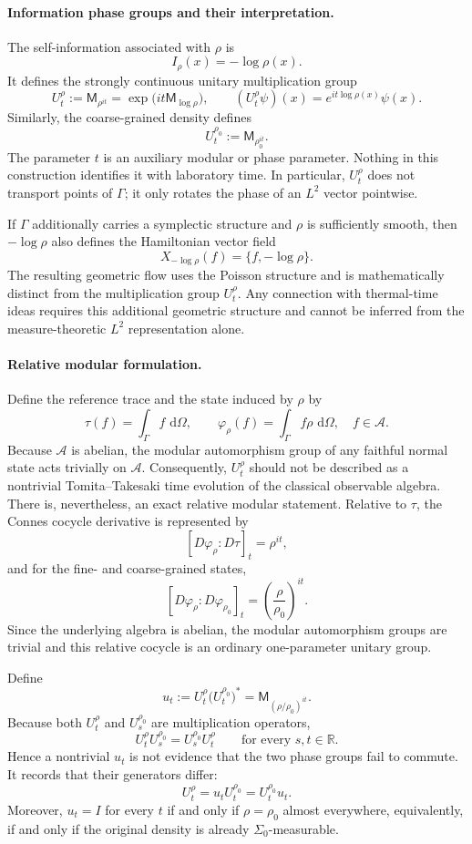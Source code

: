 \documentclass[a4paper,11pt]{article}
\theoremstyle{definition}
\newcommand{\dd}{\,\mathrm{d}}
\newcommand{\Mop}{\mathsf{M}}
\newcommand{\mA}{\mathcal{A}}
\begin{document}
\paragraph{Information phase groups and their interpretation.}
The self-information associated with $\rho$ is
\[
  I_\rho(x)=-\log\rho(x).
\]
It defines the strongly continuous unitary multiplication group
\[
  U_t^\rho:=\Mop_{\rho^{it}}
  =\exp\!\bigl(it\Mop_{\log\rho}\bigr),
  \qquad
  (U_t^\rho\psi)(x)=e^{it\log\rho(x)}\psi(x).
\]
Similarly, the coarse-grained density defines
\[
  U_t^{\rho_0}:=\Mop_{\rho_0^{it}}.
\]
The parameter $t$ is an auxiliary modular or phase parameter.  Nothing in this construction identifies it with laboratory time.  In particular, $U_t^\rho$ does not transport points of $\Gamma$; it only rotates the phase of an $L^2$ vector pointwise.

If $\Gamma$ additionally carries a symplectic structure and $\rho$ is sufficiently smooth, then $-\log\rho$ also defines the Hamiltonian vector field
\[
  X_{-\log\rho}(f)=\{f,-\log\rho\}.
\]
The resulting geometric flow uses the Poisson structure and is mathematically distinct from the multiplication group $U_t^\rho$.  Any connection with thermal-time ideas requires this additional geometric structure and cannot be inferred from the measure-theoretic $L^2$ representation alone.


\paragraph{Relative modular formulation.}
Define the reference trace and the state induced by $\rho$ by
\[
  \tau(f)=\int_\Gamma f\,\dd\Omega,
  \qquad
  \varphi_\rho(f)=\int_\Gamma f\rho\,\dd\Omega,
  \quad f\in\mA.
\]
Because $\mA$ is abelian, the modular automorphism group of any faithful normal state acts trivially on $\mA$.  Consequently, $U_t^\rho$ should not be described as a nontrivial Tomita--Takesaki time evolution of the classical observable algebra.  There is, nevertheless, an exact relative modular statement.  Relative to $\tau$, the Connes cocycle derivative is represented by
\[
  [D\varphi_\rho:D\tau]_t=\rho^{it},
\]
and for the fine- and coarse-grained states,
\[
  [D\varphi_\rho:D\varphi_{\rho_0}]_t
  =\left(\frac{\rho}{\rho_0}\right)^{it}.
\]
Since the underlying algebra is abelian, the modular automorphism groups are trivial and this relative cocycle is an ordinary one-parameter unitary group.

Define
\[
  u_t:=U_t^\rho\bigl(U_t^{\rho_0}\bigr)^*
  =\Mop_{(\rho/\rho_0)^{it}}.
\]
Because both $U_t^\rho$ and $U_s^{\rho_0}$ are multiplication operators,
\[
  U_t^\rho U_s^{\rho_0}=U_s^{\rho_0}U_t^\rho
  \qquad\text{for every }s,t\in\mathbb{R}.
\]
Hence a nontrivial $u_t$ is not evidence that the two phase groups fail to commute.  It records that their generators differ:
\[
  U_t^\rho=u_tU_t^{\rho_0}=U_t^{\rho_0}u_t.
\]
Moreover, $u_t=I$ for every $t$ if and only if $\rho=\rho_0$ almost everywhere, equivalently, if and only if the original density is already $\Sigma_0$-measurable.
\end{document}

